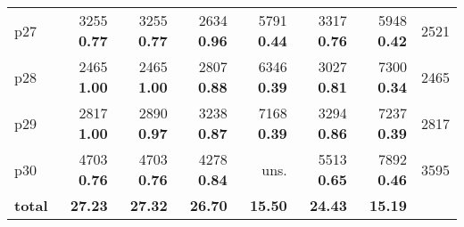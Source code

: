 \begin{tabular}{lrrrrrrr}
\multicolumn{1}{l|}{p27} & {\footnotesize 3255} \textbf{0.77} & {\footnotesize 3255} \textbf{0.77} & {\footnotesize 2634} \textbf{0.96} & {\footnotesize 5791} \textbf{0.44} & {\footnotesize 3317} \textbf{0.76} & {\footnotesize 5948} \textbf{0.42} & \multicolumn{1}{|r}{2521}\\
\multicolumn{1}{l|}{p28} & {\footnotesize 2465} \textbf{1.00} & {\footnotesize 2465} \textbf{1.00} & {\footnotesize 2807} \textbf{0.88} & {\footnotesize 6346} \textbf{0.39} & {\footnotesize 3027} \textbf{0.81} & {\footnotesize 7300} \textbf{0.34} & \multicolumn{1}{|r}{2465}\\
\multicolumn{1}{l|}{p29} & {\footnotesize 2817} \textbf{1.00} & {\footnotesize 2890} \textbf{0.97} & {\footnotesize 3238} \textbf{0.87} & {\footnotesize 7168} \textbf{0.39} & {\footnotesize 3294} \textbf{0.86} & {\footnotesize 7237} \textbf{0.39} & \multicolumn{1}{|r}{2817}\\
\multicolumn{1}{l|}{p30} & {\footnotesize 4703} \textbf{0.76} & {\footnotesize 4703} \textbf{0.76} & {\footnotesize 4278} \textbf{0.84} & uns. & {\footnotesize 5513} \textbf{0.65} & {\footnotesize 7892} \textbf{0.46} & \multicolumn{1}{|r}{3595}\\
\midrule
\textbf{total} & \textbf{27.23} & \textbf{27.32} & \textbf{26.70} & \textbf{15.50} & \textbf{24.43} & \textbf{15.19} & \\
\bottomrule
\end{tabular}

